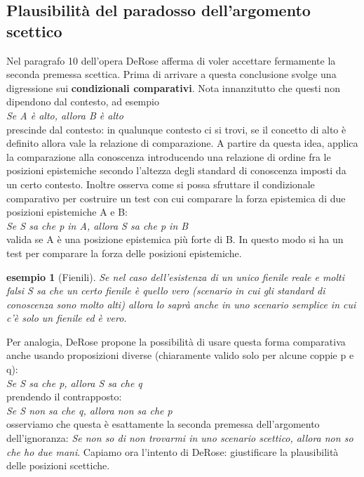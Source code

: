 \documentclass[10pt,a4paper]{article}
\newtheorem{esempio}{esempio}
\begin{document}
\subsection{Plausibilità del paradosso dell'argomento scettico}
Nel paragrafo 10 dell'opera DeRose afferma di voler accettare fermamente la seconda premessa scettica. Prima di arrivare a questa conclusione svolge una digressione sui \textbf{condizionali comparativi}. Nota innanzitutto che questi non dipendono dal contesto, ad esempio\\
\textit{Se A è alto, allora B è alto}\\
prescinde dal contesto: in qualunque contesto ci si trovi, se il concetto di alto è definito allora vale la relazione di comparazione. A partire da questa idea, applica la comparazione alla conoscenza introducendo una relazione di ordine fra le posizioni epistemiche secondo l'altezza degli standard di conoscenza imposti da un certo contesto. Inoltre osserva come si possa sfruttare il condizionale comparativo per costruire un test con cui comparare la forza epistemica di due posizioni epistemiche A e B:\\
\textit{Se S sa che p in A, allora S sa che p in B}\\
valida se A è una posizione epistemica più forte di B. In questo modo si ha un test per comparare la forza delle posizioni epistemiche. 
\begin{esempio}[Fienili]
	Se nel caso dell'esistenza di un unico fienile reale e molti falsi S sa che un certo fienile è quello vero (scenario in cui gli standard di conoscenza sono molto alti) allora lo saprà anche in uno scenario semplice in cui c'è solo un fienile ed è vero.
\end{esempio}
Per analogia, DeRose propone la possibilità di usare questa forma comparativa anche usando proposizioni diverse (chiaramente valido solo per alcune coppie p e q):\\
\textit{Se S sa che p, allora S sa che q}\\
prendendo il contrapposto:\\
\textit{Se S non sa che q, allora non sa che p}\\
osserviamo che questa è esattamente la seconda premessa dell'argomento dell'ignoranza: \textit{Se non so di non trovarmi in uno scenario scettico, allora non so che ho due mani}. Capiamo ora l'intento di DeRose: giustificare la plausibilità delle posizioni scettiche.
\end{document}
